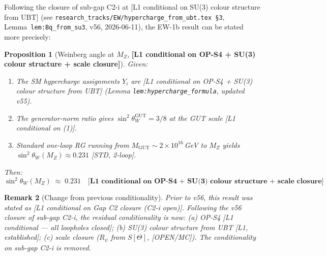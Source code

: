 \documentclass[12pt,a4paper]{article}
\newtheorem{proposition}{Proposition}[section]
\newtheorem{remark}[proposition]{Remark}
\begin{document}
Following the closure of sub-gap C2-i at [L1 conditional on SU(3) colour structure
from UBT] (see \texttt{research\_tracks/EW/hypercharge\_from\_ubt.tex §3},
Lemma~\texttt{lem:Bq\_from\_su3}, v56, 2026-06-11), the EW-1b result
can be stated more precisely:

\begin{proposition}[Weinberg angle at $M_Z$,
  \textbf{[L1 conditional on OP-S4 + SU(3) colour structure + scale closure]}]
\label{prop:sin2_thetaW_corollary}
Given:
\begin{enumerate}
  \item The SM hypercharge assignments $Y_i$ are [L1 conditional on OP-S4 + SU(3)
        colour structure from UBT] (Lemma \texttt{lem:hypercharge\_formula}, updated v55).
  \item The generator-norm ratio gives
        $\sin^2\theta_W^{\mathrm{GUT}} = 3/8$ at the GUT scale [L1 conditional on (1)].
  \item Standard one-loop RG running from $M_{\mathrm{GUT}}\sim 2\times10^{16}$\,GeV
        to $M_Z$ yields $\sin^2\theta_W(M_Z)\approx 0.231$ [STD, 2-loop].
\end{enumerate}
Then:
\[
  \boxed{\sin^2\theta_W(M_Z) \;\approx\; 0.231}
  \quad
  \textbf{[L1 conditional on OP-S4 + SU(3) colour structure + scale closure]}
\]
\end{proposition}

\begin{remark}[Change from previous conditionality]
Prior to v56, this result was stated as [L1 conditional on Gap C2 closure (C2-i open)].
Following the v56 closure of sub-gap C2-i, the residual conditionality is now:
(a) OP-S4 [L1 conditional — all loopholes closed]; (b) SU(3) colour structure
from UBT [L1, established]; (c) scale closure ($R_\psi$ from $S[\Theta]$, [OPEN/MC]).
The conditionality on sub-gap C2-i is \emph{removed}.
\end{remark}
\end{document}

